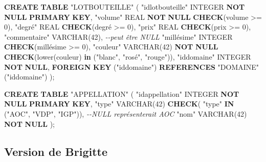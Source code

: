 \documentclass[11pt]{article}
\newenvironment{Shaded}{}{}
\newcommand{\KeywordTok}[1]{\textcolor[rgb]{0.00,0.44,0.13}{\textbf{{#1}}}}
\newcommand{\DataTypeTok}[1]{\textcolor[rgb]{0.56,0.13,0.00}{{#1}}}
\newcommand{\DecValTok}[1]{\textcolor[rgb]{0.25,0.63,0.44}{{#1}}}
\newcommand{\CommentTok}[1]{\textcolor[rgb]{0.38,0.63,0.69}{\textit{{#1}}}}
\newcommand{\OtherTok}[1]{\textcolor[rgb]{0.00,0.44,0.13}{{#1}}}
\newcommand{\FunctionTok}[1]{\textcolor[rgb]{0.02,0.16,0.49}{{#1}}}
\newcommand{\NormalTok}[1]{{#1}}
\newcommand{\OperatorTok}[1]{\textcolor[rgb]{0.40,0.40,0.40}{{#1}}}
\begin{document}
\begin{Shaded}
\begin{Highlighting}[]
\KeywordTok{CREATE} \KeywordTok{TABLE} \OtherTok{"LOTBOUTEILLE"}\NormalTok{ (}
  \OtherTok{"idlotbouteille"} \DataTypeTok{INTEGER} \KeywordTok{NOT} \KeywordTok{NULL} \KeywordTok{PRIMARY} \KeywordTok{KEY}\NormalTok{,}
  \OtherTok{"volume"} \DataTypeTok{REAL} \KeywordTok{NOT} \KeywordTok{NULL} \KeywordTok{CHECK}\NormalTok{(volume }\OperatorTok{>=} \DecValTok{0}\NormalTok{),}
  \OtherTok{"degré"} \DataTypeTok{REAL}  \KeywordTok{CHECK}\NormalTok{(degré }\OperatorTok{>=} \DecValTok{0}\NormalTok{),}
  \OtherTok{"prix"} \DataTypeTok{REAL}  \KeywordTok{CHECK}\NormalTok{(prix }\OperatorTok{>=} \DecValTok{0}\NormalTok{),}
  \OtherTok{"commentaire"} \DataTypeTok{VARCHAR}\NormalTok{(}\DecValTok{42}\NormalTok{),  }\CommentTok{{-}{-}peut être NULL}
  \OtherTok{"millésime"} \DataTypeTok{INTEGER} \KeywordTok{CHECK}\NormalTok{(millésime }\OperatorTok{>=} \DecValTok{0}\NormalTok{),}
  \OtherTok{"couleur"} \DataTypeTok{VARCHAR}\NormalTok{(}\DecValTok{42}\NormalTok{) }\KeywordTok{NOT} \KeywordTok{NULL} \KeywordTok{CHECK}\NormalTok{(}\FunctionTok{lower}\NormalTok{(couleur) }\KeywordTok{in}\NormalTok{ (}\OtherTok{"blanc"}\NormalTok{, }\OtherTok{"rosé"}\NormalTok{, }\OtherTok{"rouge"}\NormalTok{)),}
  \OtherTok{"iddomaine"} \DataTypeTok{INTEGER} \KeywordTok{NOT} \KeywordTok{NULL}\NormalTok{,}
  \KeywordTok{FOREIGN} \KeywordTok{KEY}\NormalTok{ (}\OtherTok{"iddomaine"}\NormalTok{) }\KeywordTok{REFERENCES} \OtherTok{"DOMAINE"}\NormalTok{ (}\OtherTok{"iddomaine"}\NormalTok{)}
\NormalTok{);}



\KeywordTok{CREATE} \KeywordTok{TABLE} \OtherTok{"APPELLATION"}\NormalTok{ (}
  \OtherTok{"idappellation"} \DataTypeTok{INTEGER} \KeywordTok{NOT} \KeywordTok{NULL} \KeywordTok{PRIMARY} \KeywordTok{KEY}\NormalTok{,}
  \OtherTok{"type"} \DataTypeTok{VARCHAR}\NormalTok{(}\DecValTok{42}\NormalTok{) }\KeywordTok{CHECK}\NormalTok{( }\OtherTok{"type"} \KeywordTok{IN}\NormalTok{ (}\OtherTok{"AOC"}\NormalTok{, }\OtherTok{"VDP"}\NormalTok{, }\OtherTok{"IGP"}\NormalTok{)), }\CommentTok{{-}{-}NULL représenterait AOC}
  \OtherTok{"nom"} \DataTypeTok{VARCHAR}\NormalTok{(}\DecValTok{42}\NormalTok{) }\KeywordTok{NOT} \KeywordTok{NULL}
\NormalTok{);}
\end{Highlighting}
\end{Shaded}

    \hypertarget{version-de-brigitte}{%
\subsection{Version de Brigitte}\label{version-de-brigitte}}
\end{document}
